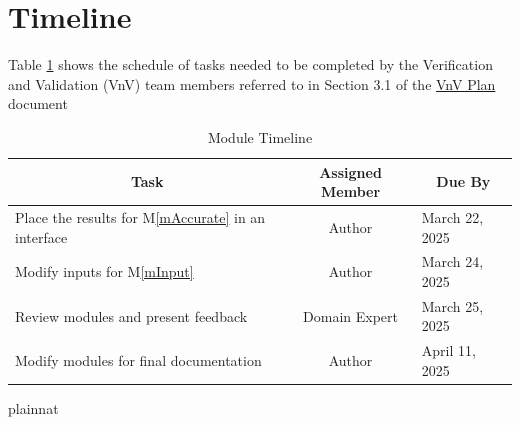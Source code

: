 \documentclass[12pt, titlepage]{article}
\begin{document}


\section{Timeline}
Table \ref{TblTimeline} shows the schedule of tasks needed to be completed by the Verification and Validation (VnV) team members referred to in Section 3.1 of the  \hyperlink{https://github.com/AliyahJimoh/2D-Localizer/blob/main/docs/VnVPlan/VnVPlan.pdf}{VnV Plan} document
\newpage

\begin{table}[H]
  \centering
  \renewcommand{\arraystretch}{1.2} %
  \begin{tabular}{|l|c|l|}
      \hline
      \multicolumn{1}{|c|}{\textbf{Task}} & \multicolumn{1}{c|}{\textbf{Assigned Member}} & \multicolumn{1}{c|}{\textbf{Due By}} \\ 
      \hline
      Place the results for M\ref{mAccurate} in an interface & Author & March 22, 2025 \\ 
      \hline
      Modify inputs for M\ref{mInput} & Author & March 24, 2025 \\ 
      \hline
      Review modules and present feedback & Domain Expert & March 25, 2025 \\ 
      \hline
      Modify modules for final documentation & Author & April 11, 2025 \\ 
      \hline
  \end{tabular}
  \caption{Module Timeline}
  \label{TblTimeline}
\end{table}

\newpage{}
 {plainnat}


\newpage{}
\end{document}
